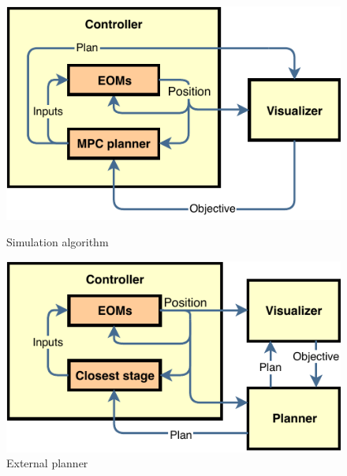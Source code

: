 \begin{figure}
	\centering
	\begin{minipage}{.5\textwidth}
		\centering
		\includegraphics[width=.9\linewidth]{Figures/InitialAlgorithm}
		\caption{Simulation algorithm}
		\label{fig::initial_algorithm}
	\end{minipage}%
	\begin{minipage}{.5\textwidth}
		\centering
		\includegraphics[width=.9\linewidth]{Figures/ExternalPlanner}
		\caption{External planner}
		\label{fig::external_planner}
	\end{minipage}
\end{figure}

